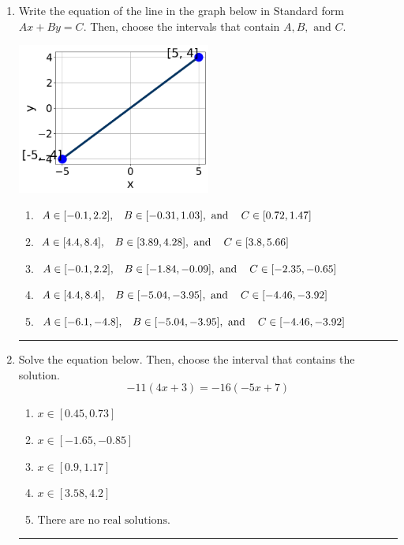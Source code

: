 \documentclass[14pt]{extbook}
\newcommand{\litem}[1]{\item#1\hspace*{-1cm}\rule{\textwidth}{0.4pt}}
\begin{document}
\begin{enumerate}
{\begin{enumerate}[label=\Alph*.]
\end{enumerate} }
\litem{
Write the equation of the line in the graph below in Standard form $Ax+By=C$. Then, choose the intervals that contain $A, B, \text{ and } C$.
\begin{center}
    \includegraphics[width=0.5\textwidth]{../Figures/linearGraphToStandardB.png}
\end{center}
\begin{enumerate}[label=\Alph*.]
\item \( A \in [-0.1, 2.2], \hspace{3mm} B \in [-0.31, 1.03], \text{ and } \hspace{3mm} C \in [0.72, 1.47] \)
\item \( A \in [4.4, 8.4], \hspace{3mm} B \in [3.89, 4.28], \text{ and } \hspace{3mm} C \in [3.8, 5.66] \)
\item \( A \in [-0.1, 2.2], \hspace{3mm} B \in [-1.84, -0.09], \text{ and } \hspace{3mm} C \in [-2.35, -0.65] \)
\item \( A \in [4.4, 8.4], \hspace{3mm} B \in [-5.04, -3.95], \text{ and } \hspace{3mm} C \in [-4.46, -3.92] \)
\item \( A \in [-6.1, -4.8], \hspace{3mm} B \in [-5.04, -3.95], \text{ and } \hspace{3mm} C \in [-4.46, -3.92] \)

\end{enumerate} }
\litem{
Solve the equation below. Then, choose the interval that contains the solution.\[ -11(4x + 3) = -16(-5x + 7) \]\begin{enumerate}[label=\Alph*.]
\item \( x \in [0.45, 0.73] \)
\item \( x \in [-1.65, -0.85] \)
\item \( x \in [0.9, 1.17] \)
\item \( x \in [3.58, 4.2] \)
\item \( \text{There are no real solutions.} \)


\end{enumerate}}
\end{enumerate}
\end{document}
